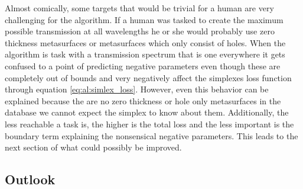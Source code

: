 \indent
Almost comically, some targets that would be trivial for a human are very challenging for the algorithm. If a human was tasked to create the maximum possible transmission at all wavelengths he or she would probably use zero thickness metasurfaces or metasurfaces which only consist of holes. When the algorithm is task with a transmission spectrum that is one everywhere it gets confused to a point of predicting negative parameters even though these are completely out of bounds and very negatively affect the simplexes loss function through equation \eqref{eq:al:simlex_loss}. However, even this behavior can be explained because the are no zero thickness or hole only metasurfaces in the database we cannot expect the simplex to know about them. Additionally, the less reachable a task is, the higher is the total loss and the less important is the boundary term explaining the nonsensical negative parameters. This leads to the next section of what could possibly be improved.
\subsection{Outlook}